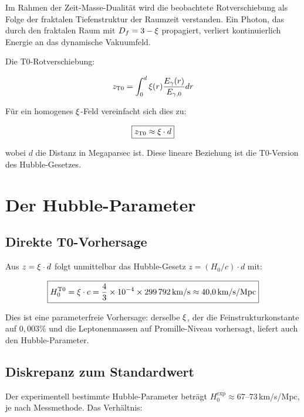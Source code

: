 Im Rahmen der Zeit-Masse-Dualität wird die beobachtete Rotverschiebung 
als Folge der fraktalen Tiefenstruktur der Raumzeit verstanden. Ein Photon, 
das durch den fraktalen Raum mit $D_f = 3 - \xi$ propagiert, verliert 
kontinuierlich Energie an das dynamische Vakuumfeld.

Die T0-Rotverschiebung:

\begin{equation}
z_{\text{T0}} = \int_0^d \xi(r) \frac{E_\gamma(r)}{E_{\gamma,0}} dr
\end{equation}

Für ein homogenes $\xi$-Feld vereinfacht sich dies zu:

\begin{equation}
\boxed{z_{\text{T0}} \approx \xi \cdot d}
\label{eq:z_T0_linear}
\end{equation}

wobei $d$ die Distanz in Megaparsec ist. Diese lineare Beziehung ist die 
T0-Version des Hubble-Gesetzes.

\section{Der Hubble-Parameter}

\subsection{Direkte T0-Vorhersage}

Aus $z = \xi \cdot d$ folgt unmittelbar das Hubble-Gesetz $z = (H_0/c) \cdot d$ 
mit:

\begin{equation}
\boxed{H_0^{\text{T0}} = \xi \cdot c = \frac{4}{3} \times 10^{-4} \times 299\,792\,\text{km/s} \approx 40{,}0\,\text{km/s/Mpc}}
\label{eq:H0_T0}
\end{equation}

Dies ist eine parameterfreie Vorhersage: derselbe $\xi$, der die 
Feinstrukturkonstante auf $0{,}003\%$ und die Leptonenmassen auf Promille-Niveau 
vorhersagt, liefert auch den Hubble-Parameter.

\subsection{Diskrepanz zum Standardwert}

Der experimentell bestimmte Hubble-Parameter beträgt $H_0^{\text{exp}} \approx 
67$--$73\,$km/s/Mpc, je nach Messmethode. Das Verhältnis:

